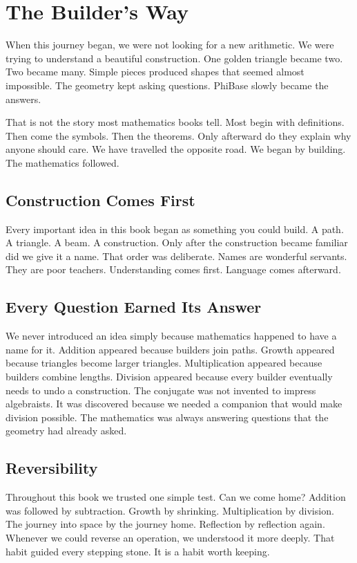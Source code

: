 \chapter{The Builder's Way}
\label{stone:builder}

When this journey began, we were not looking for a new arithmetic. We were trying to understand a beautiful construction. One golden triangle became two. Two became many. Simple pieces produced shapes that seemed almost impossible. The geometry kept asking questions. PhiBase slowly became the answers.

That is not the story most mathematics books tell. Most begin with definitions. Then come the symbols. Then the theorems. Only afterward do they explain why anyone should care. We have travelled the opposite road. We began by building. The mathematics followed.

\section*{Construction Comes First}

Every important idea in this book began as something you could build. A path. A triangle. A beam. A construction. Only after the construction became familiar did we give it a name. That order was deliberate. Names are wonderful servants. They are poor teachers. Understanding comes first. Language comes afterward.

\section*{Every Question Earned Its Answer}

We never introduced an idea simply because mathematics happened to have a name for it. Addition appeared because builders join paths. Growth appeared because triangles become larger triangles. Multiplication appeared because builders combine lengths. Division appeared because every builder eventually needs to undo a construction. The conjugate was not invented to impress algebraists. It was discovered because we needed a companion that would make division possible. The mathematics was always answering questions that the geometry had already asked.

\section*{Reversibility}

Throughout this book we trusted one simple test. Can we come home? Addition was followed by subtraction. Growth by shrinking. Multiplication by division. The journey into space by the journey home. Reflection by reflection again. Whenever we could reverse an operation, we understood it more deeply. That habit guided every stepping stone. It is a habit worth keeping.

